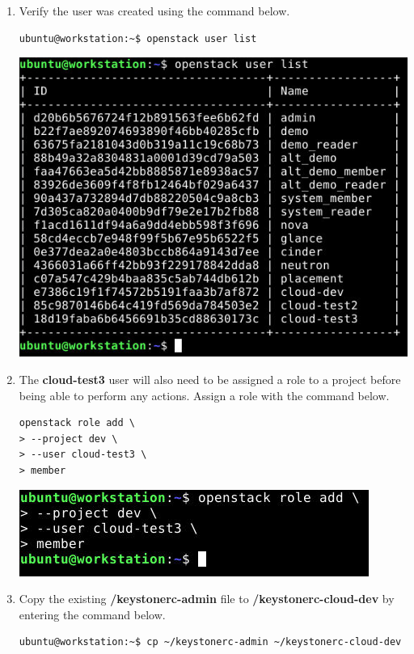 \documentclass[letterpaper, 12pt]{article}
\begin{document}
\begin{enumerate}
    \item Verify the user was created using the command below.
\begin{lstlisting}
ubuntu@workstation:~$ openstack user list
\end{lstlisting}

    \begin{center}
        \includegraphics[width=\linewidth]{images/part4/step4.png}
    \end{center}

    \item The \textbf{cloud-test3} user will also need to be assigned a role to a project before being able to perform
    any actions. Assign a role with the command below.
\begin{lstlisting}
openstack role add \
> --project dev \
> --user cloud-test3 \
> member
\end{lstlisting}

    \begin{center}
        \includegraphics[width=\linewidth]{images/part4/step5.png}
    \end{center}

    \item Copy the existing \textbf{\texttildemid/keystonerc-admin} file to \textbf{\texttildemid/keystonerc-cloud-dev}
    by entering the command below.
    \label{it:copy_keystone}
\begin{lstlisting}
ubuntu@workstation:~$ cp ~/keystonerc-admin ~/keystonerc-cloud-dev
\end{lstlisting}


\end{enumerate}
\end{document}

